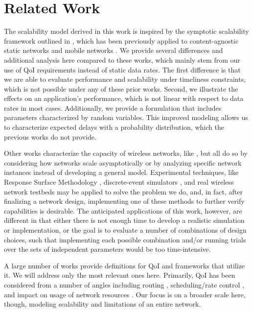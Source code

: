 \section{Related Work}
\label{sec:related_work}

The scalability model derived in this work is inspired by the symptotic scalability framework outlined in \cite{symptotics_journal}, which has been previously applied to content-agnostic static networks \cite{symptotics_framework_scalability} and mobile networks \cite{scal_analysis_mobility}. We provide several differences and additional analysis here compared to these works, which mainly stem from our use of QoI requirements instead of static data rates. The first difference is that we are able to evaluate performance and scalability under timeliness constraints, which is not possible under any of these prior works. Second, we illustrate the effects on an application's performance, which is not linear with respect to data rates in most cases. Additionally, we provide a formulation that includes parameters characterized by random variables. This improved modeling allows us to characterize expected delays with a probability distribution, which the previous works do not provide. 

Other works characterize the capacity of wireless networks, like \cite{li_capacity, gupta2000capacity}, but all do so by considering how networks scale asymptotically or by analyzing specific network instances instead of developing a general model. Experimental techniques, like Response Surface Methodology \cite{khuri2010response}, discrete-event simulators \cite{ns3}, and real wireless network testbeds \cite{iot_lab_exp_platform, wisebed} may be applied to solve the problem we do, and, in fact, after finalizing a network design, implementing one of these methods to further verify capabilities is desirable. The anticipated applications of this work, however, are different in that either there is not enough time to develop a realistic simulation or implementation, or the goal is to evaluate a number of combinations of design choices, such that implementing each possible combination and/or running trials over the sets of independent parameters would be too time-intensive. 

A large number of works provide definitions for QoI and frameworks that utilize it.  We will address only the most relevant ones here.  Primarily, QoI has been considered from a number of angles including routing \cite{quality_aware_routing_tan}, scheduling/rate control \cite{toward_qoi_rate_control,explor_vs_exploit}, and impact on usage of network resources \cite{qoi_aware_mobile_apps}. Our focus is on a broader scale here, though, modeling scalability and limitations of an entire network.  

